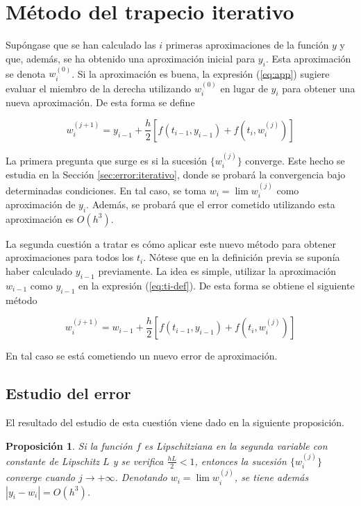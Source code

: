 \documentclass{article}
\theoremstyle{theorem-style}  %
\newtheorem{proposition}[theorem]{Proposición}
\theoremstyle{definition}
\theoremstyle{example-style}
\begin{document}
\section{Método del trapecio iterativo} \label{sec:trapecio-iterativo}
	
	Supóngase que se han calculado las $i$ primeras aproximaciones de la función $y$ y que, además, se ha obtenido una aproximación inicial para $y_i$. Esta aproximación se denota $w_i^{(0)}$. Si la aproximación es buena, la expresión (\ref{eq:app}) sugiere evaluar el miembro de la derecha utilizando $w_i^{(0)}$ en lugar de $y_i$ para obtener una nueva aproximación. De esta forma se define
	
	\begin{equation} \label{eq:ti-def}
	w_{i} ^{(j+1)} = y_{i-1} + \frac{h}{2} \left[f(t_{i-1}, y_{i-1}) + f(t_i, w_{i}^{(j)})\right]
	\end{equation}
	
	La primera pregunta que surge es si la sucesión $\{w_{i}^{(j)}\}$ converge. Este hecho se estudia en la Sección \ref{sec:error:iterativo}, donde se probará la convergencia bajo determinadas condiciones. En tal caso, se toma $w_i = \lim w_i^{(j)}$ como aproximación de $y_i$. Además, se probará que el error cometido utilizando esta aproximación es $O(h^3)$.
	
	La segunda cuestión a tratar es cómo aplicar este nuevo método para obtener aproximaciones para todos los $t_i$. Nótese que en la definición previa se suponía haber calculado $y_{i-1}$ previamente. La idea es simple, utilizar la aproximación $w_{i-1}$ como $y_{i-1}$ en la expresión (\ref{eq:ti-def}). De esta forma se obtiene el siguiente método
	
	\begin{equation} \label{eq:ti-def-2}
	w_{i} ^{(j+1)} = w_{i-1} + \frac{h}{2} \left[f(t_{i-1}, y_{i-1}) + f(t_i, w_{i}^{(j)})\right]
	\end{equation}
	
	
	En tal caso se está cometiendo un nuevo error de aproximación.
	
	\subsection{Estudio del error} \label{sec:trapecio-iterativo:error}

		El resultado del estudio de esta cuestión viene dado en la siguiente proposición.
		
		\begin{proposition}
			Si la función $f$ es Lipschitziana en la segunda variable con constante de Lipschitz $L$ y se verifica $\frac{hL}{2} < 1$, entonces la sucesión $\{w_i^{(j)}\}$ converge cuando $j \rightarrow +\infty$. Denotando $w_i = \lim w_i^{(j)}$, se tiene además $\left|y_{i} - w_{i}\right| = O(h^3)$.
		\end{proposition}
		
\end{document}
